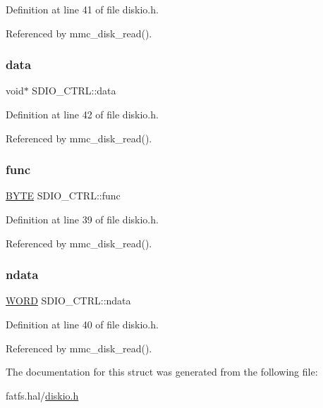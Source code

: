 Definition at line 41 of file diskio.\+h.



Referenced by mmc\+\_\+disk\+\_\+read().

\mbox{\label{structSDIO__CTRL_ab04c9adb4d3027a14925fb30b469f0c0}} 
\subsubsection{\texorpdfstring{data}{data}}
{\footnotesize\ttfamily void$\ast$ S\+D\+I\+O\+\_\+\+C\+T\+R\+L\+::data}



Definition at line 42 of file diskio.\+h.



Referenced by mmc\+\_\+disk\+\_\+read().

\mbox{\label{structSDIO__CTRL_a2f0a17848a6c7c58f826d1888469e6e3}} 
\subsubsection{\texorpdfstring{func}{func}}
{\footnotesize\ttfamily \hyperlink{ff_8h_a4ae1dab0fb4b072a66584546209e7d58}{B\+Y\+TE} S\+D\+I\+O\+\_\+\+C\+T\+R\+L\+::func}



Definition at line 39 of file diskio.\+h.



Referenced by mmc\+\_\+disk\+\_\+read().

\mbox{\label{structSDIO__CTRL_a44edc7d37688ac4f3a1ba3d66e909767}} 
\subsubsection{\texorpdfstring{ndata}{ndata}}
{\footnotesize\ttfamily \hyperlink{ff_8h_a197942eefa7db30960ae396d68339b97}{W\+O\+RD} S\+D\+I\+O\+\_\+\+C\+T\+R\+L\+::ndata}



Definition at line 40 of file diskio.\+h.



Referenced by mmc\+\_\+disk\+\_\+read().



The documentation for this struct was generated from the following file\+:\begin{DoxyCompactItemize}
\item 
fatfs.\+hal/\hyperlink{diskio_8h}{diskio.\+h}\end{DoxyCompactItemize}
